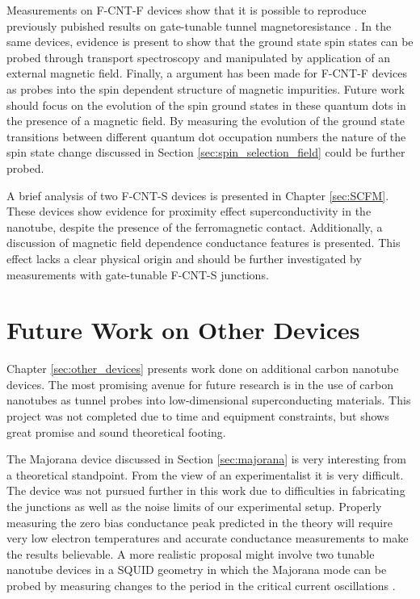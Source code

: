 Measurements on F-CNT-F devices show that it is possible to reproduce previously pubished results on gate-tunable tunnel magnetoresistance \cite{Sahoo2005, Aurich2010}. In the same devices, evidence is present to show that the ground state spin states can be probed through transport spectroscopy and manipulated by application of an external magnetic field. Finally, a argument has been made for F-CNT-F devices as probes into the spin dependent structure of magnetic impurities. Future work should focus on the evolution of the spin ground states in these quantum dots in the presence of a magnetic field. By measuring the evolution of the ground state transitions between different quantum dot occupation numbers the nature of the spin state change discussed in Section \ref{sec:spin_selection_field} could be further probed.

A brief analysis of two F-CNT-S devices is presented in Chapter \ref{sec:SCFM}. These devices show evidence for proximity effect superconductivity in the nanotube, despite the presence of the ferromagnetic contact. Additionally, a discussion of magnetic field dependence conductance features is presented. This effect lacks a clear physical origin and should be further investigated by measurements with gate-tunable F-CNT-S junctions.

\section{Future Work on Other Devices}

Chapter \ref{sec:other_devices} presents work done on additional carbon nanotube devices. The most promising avenue for future research is in the use of carbon nanotubes as tunnel probes into low-dimensional superconducting materials. This project was not completed due to time and equipment constraints, but shows great promise and sound theoretical footing. 

The Majorana device discussed in Section \ref{sec:majorana} is very interesting from a theoretical standpoint. From the view of an experimentalist it is very difficult. The device was not pursued further in this work due to difficulties in fabricating the junctions as well as the noise limits of our experimental setup. Properly measuring the zero bias conductance peak predicted in the theory will require very low electron temperatures and accurate conductance measurements to make the results believable. A more realistic proposal might involve two tunable nanotube devices in a SQUID geometry in which the Majorana mode can be probed by measuring changes to the period in the critical current oscillations \cite{Wang2015}. 